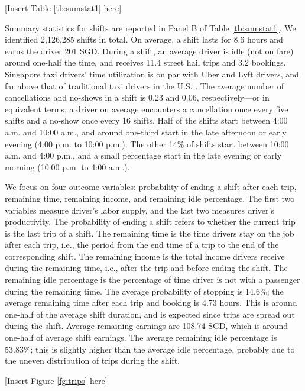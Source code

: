 \documentclass[reviewmode]{AEA}
\begin{document}
\begin{center}
	[Insert Table \ref{tb:sumstat1} here]
\end{center}


Summary statistics for shifts are reported in Panel B of Table \ref{tb:sumstat1}. We identified 2,126,285 shifts in total. On average, a shift lasts for 8.6 hours and earns the driver 201 SGD. During a shift, an average driver is idle (not on fare) around one-half the time, and receives 11.4 street hail trips and 3.2 bookings.  Singapore taxi drivers' time utilization is on par with Uber and Lyft drivers, and far above that of traditional taxi drivers in the U.S. \citep{cramer2016disruptive}. The average number of cancellations and no-shows in a shift is 0.23 and 0.06, respectively---or in equivalent terms, a driver on average encounters a cancellation once every five shifts and a no-show once every 16 shifts. Half of the shifts start between 4:00 a.m. and 10:00 a.m., and around one-third start in the late afternoon or early evening (4:00 p.m. to 10:00 p.m.). The other 14\% of shifts start between 10:00 a.m. and 4:00 p.m., and a small percentage start in the late evening or early morning (10:00 p.m. to 4:00 a.m.).


We focus on four outcome variables: probability of ending a shift after each trip, remaining time, remaining income, and remaining idle percentage. The first two variables measure driver's labor supply, and the last two measures driver's productivity. The probability of ending a shift refers to whether the current trip is the last trip of a shift. The remaining time is the time drivers stay on the job after each trip, i.e., the period from the end time of a trip to the end of the corresponding shift. The remaining income is the total income drivers receive during the remaining time, i.e., after the trip and before ending the shift. The remaining idle percentage is the percentage of time driver is not with a passenger during the remaining time. The average probability of stopping is 14.6\%; the average remaining time after each trip and booking is 4.73 hours. This is around one-half of the average shift duration, and is expected since trips are spread out during the shift. Average remaining earnings are 108.74 SGD, which is around one-half of average shift earnings. The average remaining idle percentage is 53.83\%; this is slightly higher than the average idle percentage, probably due to the uneven distribution of trips during the shift.

\begin{center}
	[Insert Figure \ref{fg:trips} here]
\end{center}
\end{document}
